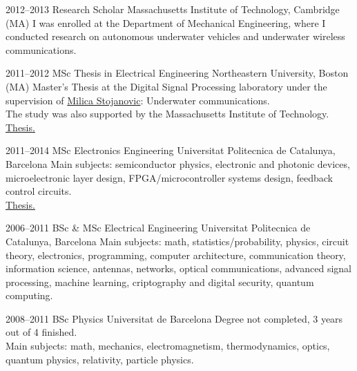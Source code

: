 \documentclass[]{friggeri-cv} %
\begin{document}
\begin{entrylist}


\entry
{2012--2013}
{Research Scholar}
{Massachusetts Institute of Technology, Cambridge (MA)}
{I was enrolled at the Department of Mechanical Engineering,
  where I conducted research on autonomous underwater vehicles and
  underwater wireless communications.}


\entry
{2011--2012}
{MSc Thesis in Electrical Engineering}
{Northeastern University, Boston (MA)}
{Master's Thesis at the Digital Signal Processing laboratory under the
  supervision of \href{http://millitsa.coe.neu.edu/}{Milica
    Stojanovic}: Underwater communications.\\
  The study was also supported by the Massachusetts Institute of
  Technology.\\
  \href{http://seagrant.mit.edu/publications/MITSG_12-15.pdf}{{\FA \faExternalLink} Thesis.}
}

\entry
{2011--2014}
{MSc Electronics Engineering}
{Universitat Politecnica de Catalunya, Barcelona}
{Main subjects: semiconductor physics, electronic and photonic
  devices, microelectronic layer design, FPGA/microcontroller systems
  design, feedback control circuits.\\
  \href{http://upcommons.upc.edu/handle/2117/97991}{{\FA \faExternalLink} Thesis.}
}


\entry
{2006--2011}
{BSc \& MSc Electrical Engineering}
{Universitat Politecnica de Catalunya, Barcelona}
{Main subjects: math, statistics/probability, physics, circuit theory,
  electronics, programming, computer architecture, communication
  theory, information science, antennas, networks, optical
  communications, advanced signal processing, machine learning,
  criptography and digital security, quantum computing.
}


\entry
{2008--2011}
{BSc Physics}
{Universitat de Barcelona}
{Degree not completed, 3 years out of 4 finished.\\
Main subjects: math, mechanics, electromagnetism, thermodynamics,
optics, quantum physics, relativity, particle physics.
}


\end{entrylist}
\end{document}
